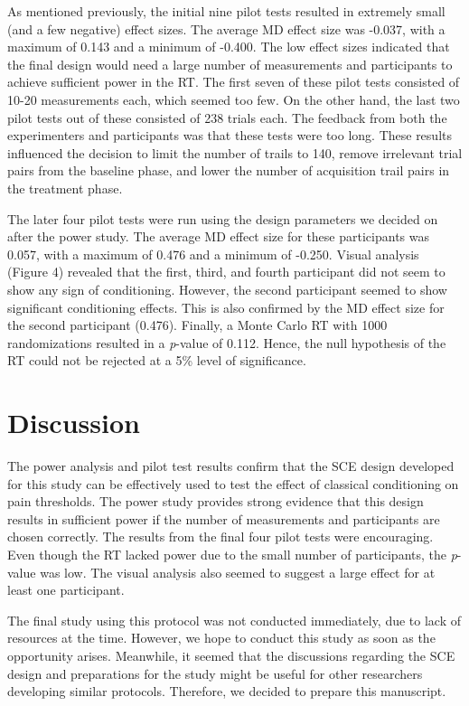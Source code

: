 \documentclass[empirical,issue, twocolumn,authordate]{jote-new-article}
\begin{document}
As mentioned previously, the initial nine pilot tests resulted in extremely small (and a few negative) effect sizes. The average MD effect size was -0.037, with a maximum of 0.143 and a minimum of -0.400. The low effect sizes indicated that the final design would need a large number of measurements and participants to achieve sufficient power in the RT. The first seven of these pilot tests consisted of 10-20 measurements each, which seemed too few. On the other hand, the last two pilot tests out of these consisted of 238 trials each. The feedback from both the experimenters and participants was that these tests were too long. These results influenced the decision to limit the number of trails to 140, remove irrelevant trial pairs from the baseline phase, and lower the number of acquisition trail pairs in the treatment phase. 




The later four pilot tests were run using the design parameters we decided on after the power study. The average MD effect size for these participants was 0.057, with a maximum of 0.476 and a minimum of -0.250. Visual analysis (Figure 4) revealed that the first, third, and fourth participant did not seem to show any sign of conditioning. However, the second participant seemed to show significant conditioning effects. This is also confirmed by the MD effect size for the second participant (0.476). Finally, a Monte Carlo RT with 1000 randomizations resulted in a \emph{p}-value of 0.112. Hence, the null hypothesis of the RT could not be rejected at a 5\% level of significance. 


\section{Discussion}


The power analysis and pilot test results confirm that the SCE design developed for this study can be effectively used to test the effect of classical conditioning on pain thresholds. The power study provides strong evidence that this design results in sufficient power if the number of measurements and participants are chosen correctly. The results from the final four pilot tests were encouraging. Even though the RT lacked power due to the small number of participants, the \emph{p}-value was low. The visual analysis also seemed to suggest a large effect for at least one participant. 

The final study using this protocol was not conducted immediately, due to lack of resources at the time. However, we hope to conduct this study as soon as the opportunity arises. Meanwhile, it seemed that the discussions regarding the SCE design and preparations for the study might be useful for other researchers developing similar protocols. Therefore, we decided to prepare this manuscript.
\end{document}

